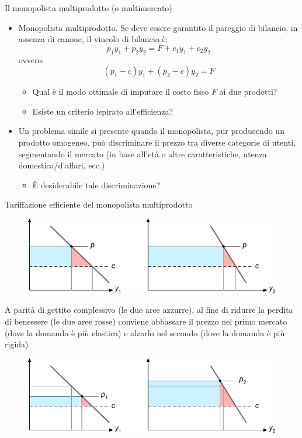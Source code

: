 \documentclass[aspectratio=149,11pt]{beamer}
\begin{document}
\begin{frame}{Il monopolista multiprodotto (o multimercato)}
\begin{itemize}
\item Monopolista \alert{multiprodotto}. Se deve essere garantito il pareggio di bilancio, in
assenza di canone, il vincolo di bilancio è:
\begin{equation*}
 p_1y_1+p_2y_2=F+c_1y_1+c_2y_2
\end{equation*}
ovvero:
\begin{equation*}
 (p_1-c)y_1+(p_2-c)y_2=F
\end{equation*}
\begin{itemize}
\item Qual è il modo ottimale di imputare il costo fisso $F$ ai due prodotti?
\item Esiste un criterio ispirato all'efficienza?
\end{itemize}
\item Un problema simile si presente quando il monopolista, pur producendo un
prodotto omogeneo, può \alert{discriminare} il prezzo tra diverse categorie di
utenti, segmentando il mercato (in base all'età o altre caratteristiche,
utenza domestica/d'affari, ecc.)
\begin{itemize}
\item È desiderabile tale discriminazione?
\end{itemize}
\end{itemize}
\end{frame}

\begin{frame}{Tariffazione efficiente del monopolista multiprodotto}
\begin{figure}[htbp]
\centering
\includegraphics[width=.7\textwidth]{./figure/ramsey-1-color.pdf}
\end{figure}

A parità di gettito complessivo (le due aree azzurre), al fine di ridurre la perdita
di benessere (le due aree rosse) conviene abbassare il prezzo nel primo mercato (dove
la domanda è più elastica) e alzarlo nel secondo (dove la domanda è più
rigida)

\begin{figure}[htbp]
\centering
\includegraphics[width=.7\textwidth]{./figure/ramsey-2-color.pdf}
\end{figure}
\end{frame}
\end{document}
